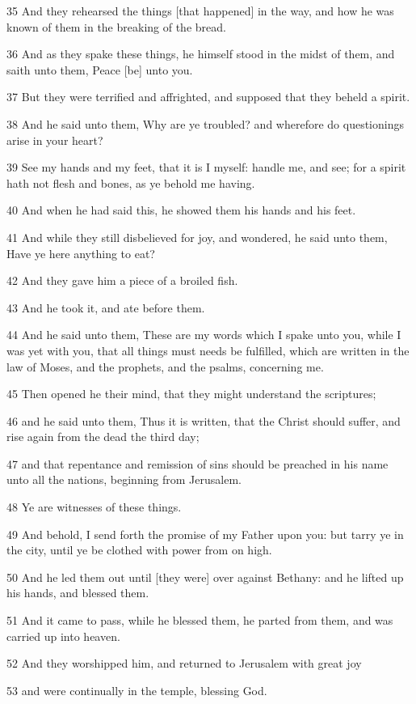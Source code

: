 \par 35 And they rehearsed the things [that happened] in the way, and how he was known of them in the breaking of the bread.
\par 36 And as they spake these things, he himself stood in the midst of them, and saith unto them, Peace [be] unto you.
\par 37 But they were terrified and affrighted, and supposed that they beheld a spirit.
\par 38 And he said unto them, Why are ye troubled? and wherefore do questionings arise in your heart?
\par 39 See my hands and my feet, that it is I myself: handle me, and see; for a spirit hath not flesh and bones, as ye behold me having.
\par 40 And when he had said this, he showed them his hands and his feet.
\par 41 And while they still disbelieved for joy, and wondered, he said unto them, Have ye here anything to eat?
\par 42 And they gave him a piece of a broiled fish.
\par 43 And he took it, and ate before them.
\par 44 And he said unto them, These are my words which I spake unto you, while I was yet with you, that all things must needs be fulfilled, which are written in the law of Moses, and the prophets, and the psalms, concerning me.
\par 45 Then opened he their mind, that they might understand the scriptures;
\par 46 and he said unto them, Thus it is written, that the Christ should suffer, and rise again from the dead the third day;
\par 47 and that repentance and remission of sins should be preached in his name unto all the nations, beginning from Jerusalem.
\par 48 Ye are witnesses of these things.
\par 49 And behold, I send forth the promise of my Father upon you: but tarry ye in the city, until ye be clothed with power from on high.
\par 50 And he led them out until [they were] over against Bethany: and he lifted up his hands, and blessed them.
\par 51 And it came to pass, while he blessed them, he parted from them, and was carried up into heaven.
\par 52 And they worshipped him, and returned to Jerusalem with great joy
\par 53 and were continually in the temple, blessing God.

